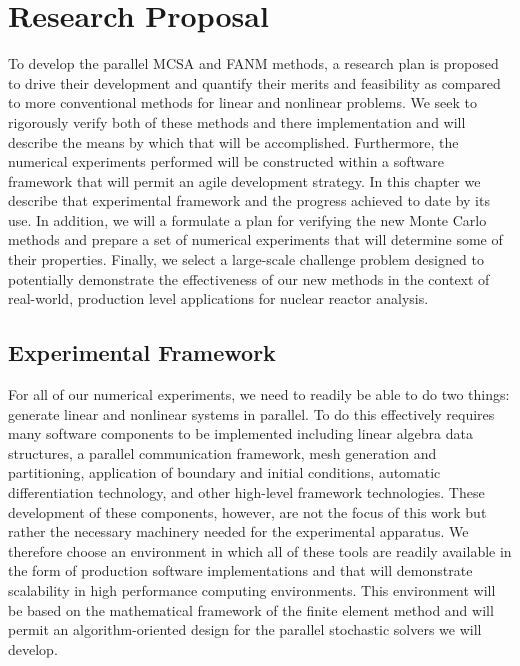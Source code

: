 \chapter{Research Proposal}
\label{ch:research_proposal}
To develop the parallel MCSA and FANM methods, a research plan is
proposed to drive their development and quantify their merits and
feasibility as compared to more conventional methods for linear and
nonlinear problems. We seek to rigorously verify both of these methods
and there implementation and will describe the means by which that
will be accomplished. Furthermore, the numerical experiments performed
will be constructed within a software framework that will permit an
agile development strategy. In this chapter we describe that
experimental framework and the progress achieved to date by its
use. In addition, we will a formulate a plan for verifying the new
Monte Carlo methods and prepare a set of numerical experiments that
will determine some of their properties. Finally, we select a
large-scale challenge problem designed to potentially demonstrate the
effectiveness of our new methods in the context of real-world,
production level applications for nuclear reactor analysis.

\section{Experimental Framework}
\label{sec:experimental_framework}
For all of our numerical experiments, we need to readily be able to do
two things: generate linear and nonlinear systems in parallel. To do
this effectively requires many software components to be implemented
including linear algebra data structures, a parallel communication
framework, mesh generation and partitioning, application of boundary
and initial conditions, automatic differentiation technology, and
other high-level framework technologies. These development of these
components, however, are not the focus of this work but rather the
necessary machinery needed for the experimental apparatus. We
therefore choose an environment in which all of these tools are
readily available in the form of production software implementations
and that will demonstrate scalability in high performance computing
environments. This environment will be based on the mathematical
framework of the finite element method and will permit an
algorithm-oriented design for the parallel stochastic solvers we will
develop.

